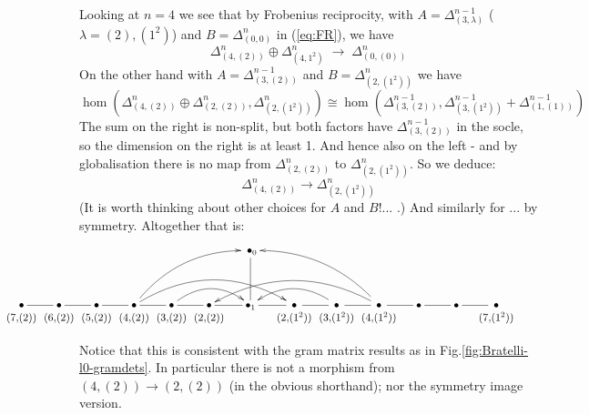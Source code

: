 Looking at $n=4$ we see that by Frobenius reciprocity, 
with $A = \Delta^{n-1}_{(3,\lambda)}$ ($\lambda = (2), (1^2)$) and 
$B=\Delta^{n}_{(0,0)}$ in (\ref{eq:FR}), 
we have 
\[
\Delta^{n}_{(4,(2))} \oplus \Delta^{n}_{(4,1^2)} \; \rightarrow\; \Delta^{n}_{(0,(0))}
\]
On the other hand with $A=\Delta^{n-1}_{(3,(2))}$ and $B=\Delta^{n}_{(2,(1^2))}$ we have
\[
\hom(\Delta^{n}_{(4,(2))} \oplus \Delta^{n}_{(2,(2))} , \Delta^{n}_{(2,(1^2))} ) 
 \cong  
\hom(\Delta^{n-1}_{(3,(2))} , \Delta^{n-1}_{(3,(1^2))} + \Delta^{n-1}_{(1,(1))}) 
\]
The sum on the right is non-split, but both factors have $ \Delta^{n-1}_{(3,(2))} $ in the socle, so  the dimension on the right is at least 1. 
And hence also on the left - and by globalisation there is no map from 
$ \Delta^{n}_{(2,(2))}$ to $\Delta^{n}_{(2,(1^2))} $. So we deduce:
\[
\Delta^{n}_{(4,(2))}  \rightarrow   \Delta^{n}_{(2,(1^2))}
\]
(It is worth thinking about other choices for $A$ and $B$!... .) 
And similarly for ... by symmetry. 
Altogether that is:  %
\[
\hspace{-2.1cm} 
\xymatrix{
   &&&&&& \;\bullet_0 \ar@{-}[d] \\
\ver{(7,\!(2))} \ar@{-}[r] & 
\ver{(6,\!(2))} \ar@{-}[r] & 
\ver{(5,\!(2))} \ar@{-}[r] & 
\ver{(4,\!(2))} \ar@{-}[r] \ar@[red]@/^1.3pc/[rrru] \ar@[red]@/^1.9863pc/[rrrr] & 
\ver{(3,\!(2))} \ar@{-}[r] \ar@[red]@/^1.3pc/[rr] & 
\ver{(2,\!(2))} \ar@{-}[r] & 
\bullet_1 \ar@{-}[r] & 
\ver{(2,\!(1^2))} \ar@{-}[r] & 
\ver{(3,\!(1^2))} \ar@{-}[r] \ar@[red]@/_1.3pc/[ll] & 
\ver{(4,\!(1^2))} \ar@{-}[r] \ar@[red]@/_1.3pc/[lllu] \ar@[red]@/_1.93pc/[llll] & 
\bullet \ar@{-}[r] & 
\bullet \ar@{-}[r] & 
\ver{(7,\!(1^2))} & 
}
\] 

Notice that this is consistent with the gram matrix results as in Fig.\ref{fig:Bratelli-l0-gramdets}. 
In particular there is not a morphism from $(4,(2)) \rightarrow (2,(2))$ 
(in the obvious shorthand); nor the symmetry image version. 

